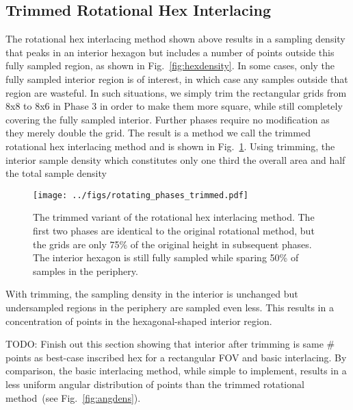 \documentclass{article}
\newcommand{\reffig}[1]{Fig.~\ref{fig:#1}}
\begin{document}
\subsection{Trimmed Rotational Hex Interlacing}
\label{sec:trimmed}

The rotational hex interlacing method shown above results in a sampling density that peaks in an interior hexagon but includes a number of points outside this fully sampled region, as shown in \reffig{hexdensity}.
%
In some cases, only the fully sampled interior region is of interest, in which case any samples outside that region are wasteful.
%
In such situations, we simply trim the rectangular grids from 8x8 to 8x6 in Phase 3 in order to make them more square, while still completely covering the fully sampled interior.
%
Further phases require no modification as they merely double the grid.
%
The result is a method we call the trimmed rotational hex interlacing method and is shown in \reffig{trimmedrotatingphases}.
%
Using trimming, the interior sample density which constitutes only one third the overall area and half the total sample density

\begin{figure}[ht]
\centering
\texttt{[image: ../figs/rotating\_phases\_trimmed.pdf]}
\caption{
\label{fig:trimmedrotatingphases} 
The trimmed variant of the rotational hex interlacing method.
%
The first two phases are identical to the original rotational method, but the grids are only 75\% of the original height in subsequent phases.
%
The interior hexagon is still fully sampled while sparing 50\% of samples in the periphery.
}
\end{figure}


%
With trimming, the sampling density in the interior is unchanged but undersampled regions in the periphery are sampled even less.
%
This results in a concentration of points in the hexagonal-shaped interior region.


TODO: Finish out this section showing that interior after trimming is same \# points as best-case inscribed hex for a rectangular FOV and basic interlacing.
%
By comparison, the basic interlacing method, while simple to implement, results in a less uniform angular distribution of points than the trimmed rotational method~(see \reffig{angdens}).
\end{document}
